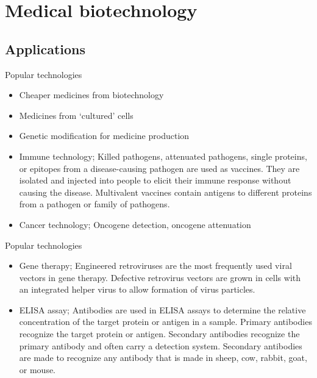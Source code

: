 \documentclass[ignorenonframetext,aspectratio=169]{beamer}
\providecommand{\tightlist}{%
  \setlength{\itemsep}{0pt}\setlength{\parskip}{0pt}}
\begin{document}
\hypertarget{medical-biotechnology}{%
\section{Medical biotechnology}\label{medical-biotechnology}}

\hypertarget{applications-1}{%
\subsection{Applications}\label{applications-1}}

\begin{frame}{Popular technologies}
\protect\hypertarget{popular-technologies}{}

\begin{itemize}
\tightlist
\item
  Cheaper medicines from biotechnology
\item
  Medicines from `cultured' cells
\item
  Genetic modification for medicine production
\item
  Immune technology; Killed pathogens, attenuated pathogens, single
  proteins, or epitopes from a disease-causing pathogen are used as
  vaccines. They are isolated and injected into people to elicit their
  immune response without causing the disease. Multivalent vaccines
  contain antigens to different proteins from a pathogen or family of
  pathogens.
\item
  Cancer technology; Oncogene detection, oncogene attenuation
\end{itemize}

\end{frame}

\begin{frame}{Popular technologies}
\protect\hypertarget{popular-technologies-1}{}

\begin{itemize}
\tightlist
\item
  Gene therapy; Engineered retroviruses are the most frequently used
  viral vectors in gene therapy. Defective retrovirus vectors are grown
  in cells with an integrated helper virus to allow formation of virus
  particles.
\item
  ELISA assay; Antibodies are used in ELISA assays to determine the
  relative concentration of the target protein or antigen in a sample.
  Primary antibodies recognize the target protein or antigen. Secondary
  antibodies recognize the primary antibody and often carry a detection
  system. Secondary antibodies are made to recognize any antibody that
  is made in sheep, cow, rabbit, goat, or mouse.
\end{itemize}

\end{frame}
\end{document}
